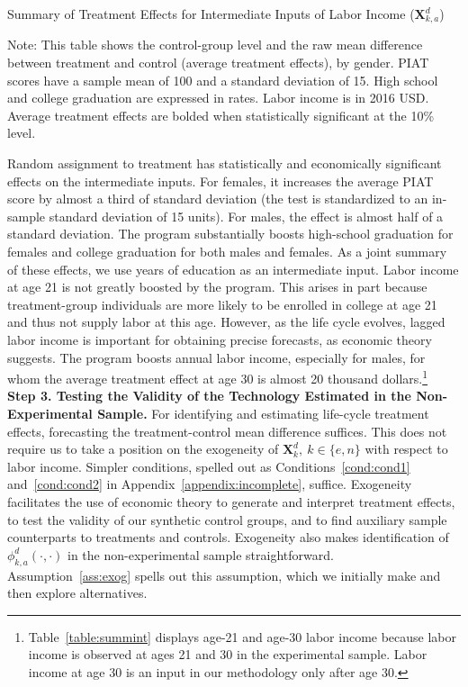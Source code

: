 \begin{table}[!htpb]
\begin{threeparttable}
\caption{Summary of Treatment Effects for Intermediate Inputs of Labor Income ($\bm{X}^d_{k,a}$)} \label{table:summint}
\centering

\begin{tablenotes}
\footnotesize
\item Note: This table shows the control-group level and the raw mean difference between treatment and control (average treatment effects), by gender. PIAT scores have a sample mean of 100 and a standard deviation of 15. High school and college graduation are expressed in rates. Labor income is in 2016 USD. Average treatment effects are bolded when statistically significant at the 10\% level.
\end{tablenotes}
\end{threeparttable}
\end{table}

Random assignment to treatment has statistically and economically significant effects on the intermediate inputs. For females, it increases the average PIAT score by almost a third of standard deviation (the test is standardized to an in-sample standard deviation of 15 units). For males, the effect is almost half of a standard deviation. The program substantially boosts high-school graduation for females and college graduation for both males and females. As a joint summary of these effects, we use years of education as an intermediate input. Labor income at age 21 is not greatly boosted by the program. This arises in part because treatment-group individuals are more likely to be enrolled in college at age 21 and thus not supply labor at this age. However, as the life cycle evolves, lagged labor income is important for obtaining precise forecasts, as economic theory suggests. The program boosts annual labor income, especially for males, for whom the average treatment effect at age 30 is almost 20 thousand dollars.\footnote{Table~\ref{table:summint} displays age-21 and age-30 labor income because labor income is observed at ages 21 and 30 in the experimental sample. Labor income at age 30 is an input in our methodology only after age 30.}\\

\noindent \textbf{Step 3. Testing the Validity of the Technology Estimated in the Non-Experimental Sample.} For identifying and estimating life-cycle treatment effects, forecasting the treatment-control mean difference suffices. This does not require us to take a position on the exogeneity of $\bm{X}^d_k, \: k \in \{e,n\}$ with respect to labor income. Simpler conditions, spelled out as Conditions~\ref{cond:cond1} and~\ref{cond:cond2} in Appendix~\ref{appendix:incomplete}, suffice. Exogeneity facilitates the use of economic theory to generate and interpret treatment effects, to test the validity of our synthetic control groups, and to find auxiliary sample counterparts to treatments and controls. Exogeneity also makes identification of $\phi^d_{k,a}\left( \cdot, \cdot \right)$ in the non-experimental sample straightforward. Assumption~\ref{ass:exog} spells out this assumption, which we initially make and then explore alternatives.

